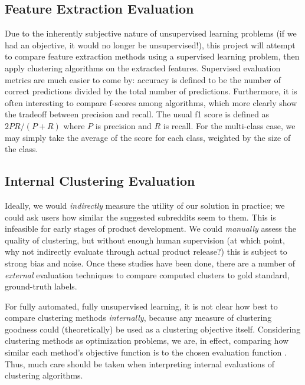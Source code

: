 \documentclass[]{article}
\begin{document}
\subsection{Feature Extraction Evaluation}
Due to the inherently subjective nature of unsupervised learning problems (if we had an objective, it would no longer be unsupervised!), this project will attempt to compare feature extraction methods using a supervised learning problem, then apply clustering algorithms on the extracted features. Supervised evaluation metrics are much easier to come by: accuracy is defined to be the number of correct predictions divided by the total number of predictions. Furthermore, it is often interesting to compare f-scores among algorithms, which more clearly show the tradeoff between precision and recall. The usual f1 score is defined as $2 P R / (P+R)$ where $P$ is precision and $R$ is recall. For the multi-class case, we may simply take the average of the score for each class, weighted by the size of the class.

\subsection{Internal Clustering Evaluation}
Ideally, we would \emph{indirectly} measure the utility of our solution in practice; we could ask users how similar the suggested subreddits seem to them. This is infeasible for early stages of product development. We could \emph{manually} assess the quality of clustering, but without enough human supervision (at which point, why not indirectly evaluate through actual product release?) this is subject to strong bias and noise. Once these studies have been done, there are a number of \emph{external} evaluation techniques to compare computed clusters to gold standard, ground-truth labels.

For fully automated, fully unsupervised learning, it is not clear how best to compare clustering methods \emph{internally}, because any measure of clustering goodness could (theoretically) be used as a clustering objective itself. Considering clustering methods as optimization problems, we are, in effect, comparing how similar each method's objective function is to the chosen evaluation function \cite{Feldman-textmining}. Thus, much care should be taken when interpreting internal evaluations of clustering algorithms.
\end{document}
